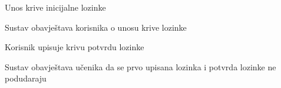 \begin{packed_item}
\begin{packed_item}
\begin{packed_enum}
							\end{packed_enum}
							\item[4.a] Unos krive inicijalne lozinke
							\item[] \begin{packed_enum}
								
								\item Sustav obavještava korisnika o unosu krive lozinke
								
							\end{packed_enum}
							\item[6.a] Korisnik upisuje krivu potvrdu lozinke
							\item[] \begin{packed_enum}
								
								\item Sustav obavještava učenika da se prvo upisana lozinka i potvrda lozinke ne podudaraju
								
							\end{packed_enum}
								

							
						\end{packed_item}
					\end{packed_item}

